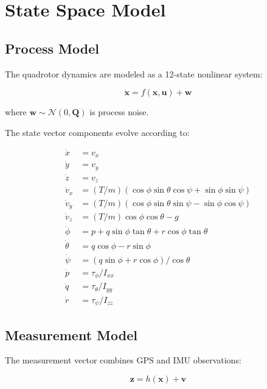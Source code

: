 \section{State Space Model}

\subsection{Process Model}

The quadrotor dynamics are modeled as a 12-state nonlinear system:

\begin{equation}
    \dot{\mathbf{x}} = f(\mathbf{x}, \mathbf{u}) + \mathbf{w}
\end{equation}

where $\mathbf{w} \sim \mathcal{N}(0, \mathbf{Q})$ is process noise.

The state vector components evolve according to:

\begin{align}
    \dot{x} &= v_x \\
    \dot{y} &= v_y \\
    \dot{z} &= v_z \\
    \dot{v}_x &= (T/m)(\cos\phi\sin\theta\cos\psi + \sin\phi\sin\psi) \\
    \dot{v}_y &= (T/m)(\cos\phi\sin\theta\sin\psi - \sin\phi\cos\psi) \\
    \dot{v}_z &= (T/m)\cos\phi\cos\theta - g \\
    \dot{\phi} &= p + q\sin\phi\tan\theta + r\cos\phi\tan\theta \\
    \dot{\theta} &= q\cos\phi - r\sin\phi \\
    \dot{\psi} &= (q\sin\phi + r\cos\phi)/\cos\theta \\
    \dot{p} &= \tau_\phi / I_{xx} \\
    \dot{q} &= \tau_\theta / I_{yy} \\
    \dot{r} &= \tau_\psi / I_{zz}
\end{align}

\subsection{Measurement Model}

The measurement vector combines GPS and IMU observations:

\begin{equation}
    \mathbf{z} = h(\mathbf{x}) + \mathbf{v}
\end{equation}

